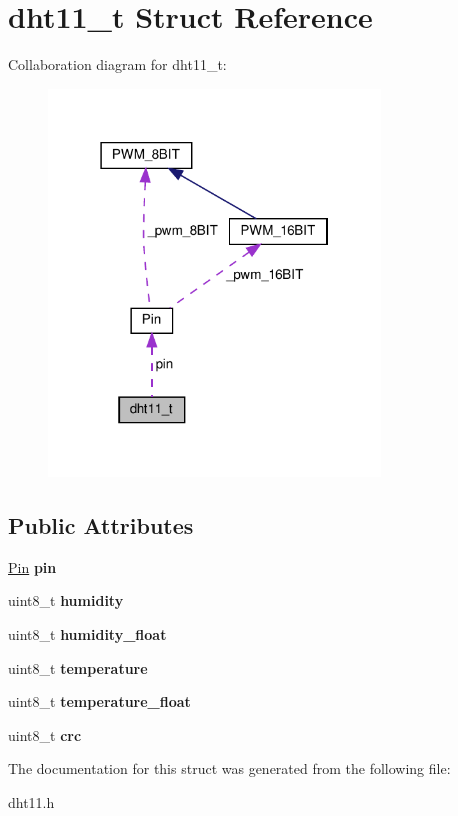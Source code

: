 \hypertarget{structdht11__t}{}\section{dht11\+\_\+t Struct Reference}
\label{structdht11__t}


Collaboration diagram for dht11\+\_\+t\+:\nopagebreak
\begin{figure}[H]
\begin{center}
\leavevmode
\includegraphics[width=250pt]{structdht11__t__coll__graph}
\end{center}
\end{figure}
\subsection*{Public Attributes}
\begin{DoxyCompactItemize}
\item 
\mbox{\label{structdht11__t_af7ba765d61375a8088a63e33b4e91a35}} 
\hyperlink{classPin}{Pin} {\bfseries pin}
\item 
\mbox{\label{structdht11__t_a981a3577bb83ac4f3f8f566e4eb9976c}} 
uint8\+\_\+t {\bfseries humidity}
\item 
\mbox{\label{structdht11__t_a3426ca69a0d25e6ff59cf1bb814194d5}} 
uint8\+\_\+t {\bfseries humidity\+\_\+float}
\item 
\mbox{\label{structdht11__t_acb375c16a957e10e3c316496492263da}} 
uint8\+\_\+t {\bfseries temperature}
\item 
\mbox{\label{structdht11__t_aebb3d3b42b5c014880980fc77af3f7b6}} 
uint8\+\_\+t {\bfseries temperature\+\_\+float}
\item 
\mbox{\label{structdht11__t_a51b07566b9cee55f9c9f473d4bda96d1}} 
uint8\+\_\+t {\bfseries crc}
\end{DoxyCompactItemize}


The documentation for this struct was generated from the following file\+:\begin{DoxyCompactItemize}
\item 
dht11.\+h\end{DoxyCompactItemize}

